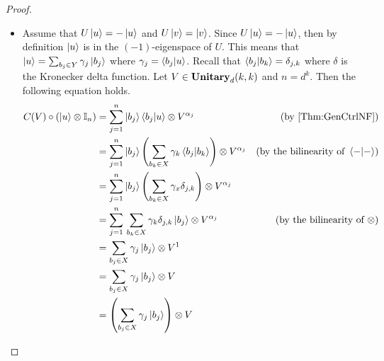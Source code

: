 \begin{proof}
\begin{itemize}
\begin{equation*}
              \left( \ket{u} - \sum_{b_j \in Y} \gamma_{b_j} \ket{b_j} \right) \otimes M
              =
              \left( \sum_{b_j \in X} \gamma_{b_j} \ket{b_j} \right) \otimes \mathbb{I}_d
          \end{equation*}
          Since $\{ \ket{\ell} \bra{k} \}_{j=1,\ell=1}^{d}$ is a basis for $\CatUnitary_d( 1, 1 )$, then $\mathbb{I}_d$ and $M$ are not linear combinations of one-another.
          Then the left-hand side and right-hand side also not linear combinations of one-another.
          Then by equating components, $\ket{u} = \sum_{b_j \in Y} \gamma_{b_j} \ket{b_j}$.
          Then $\ket{u}$ is in the $(-1)$-eigenspace of $U$.
          In conclusion, $U\ket{u} = -\ket{u}$.
    \item Assume that $U\ket{u} = -\ket{u}$ and $U\ket{v} = \ket{v}$.
          Since $U\ket{u} = -\ket{u}$, then by definition $\ket{u}$ is in the $(-1)$-eigenspace of $U$.
          This means that $\ket{u} = \sum_{b_j \in Y} \gamma_j \ket{b_j}$ where $\gamma_j = \braket{b_j|u}$.
          Recall that $\braket{b_j|b_k} = \delta_{j,k}$ where $\delta$ is the Kronecker delta function.
          Let $V \in \mathbf{Unitary}_d( k ,k )$ and $n = d^k$.
          Then the following equation holds.
          \begin{align*}
              C( V ) \circ ( \ket{u} \otimes \mathbb{I}_n )
              &=
              \sum_{j=1}^n \ket{b_j} \braket{b_j|u} \otimes V^{\alpha_j}
              &
              ( \text{by \cref{Thm:GenCtrlNF}} )
              \\
              &=
              \sum_{j=1}^n \ket{b_j} \left( \sum_{b_k \in X} \gamma_k \braket{b_j|b_k} \right) \otimes V^{\alpha_j}
              &
              ( \text{by the bilinearity of } \braket{-|-} )
              \\
              &=
              \sum_{j=1}^n \ket{b_j} \left( \sum_{b_k \in X} \gamma_x \delta_{j,k} \right) \otimes V^{\alpha_j}
              \\
              &=
              \sum_{j=1}^n \, \sum_{b_k \in X} \gamma_k \delta_{j,k} \ket{b_j} \otimes V^{\alpha_j}
              &
              ( \text{by the bilinearity of } \otimes )
              \\
              &=
              \sum_{b_j \in X} \gamma_j \ket{b_j} \otimes V^1
              \\
              &=
              \sum_{b_j \in X} \gamma_j \ket{b_j} \otimes V
              \\
              &=
              \left( \sum_{b_j \in X} \gamma_j \ket{b_j} \right) \otimes V

\end{align*}
\end{itemize}
\end{proof}
